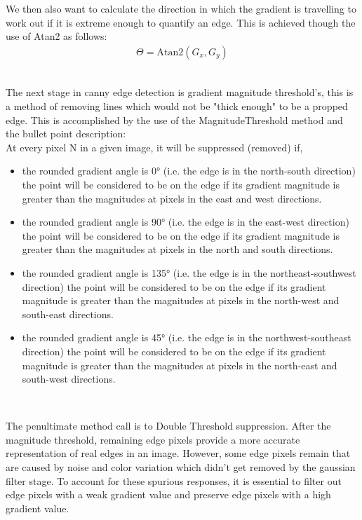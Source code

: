 \begin{FlushLeft}
    We then also want to calculate the direction in which the gradient is travelling to work out if it is extreme enough to quantify an edge. This is achieved though the use of Atan2 as follows:\\
    
    \begin{gather*}
        \Theta = \text{Atan2}(G_x, G_y)
    \end{gather*} \\ 

    \bk

    The next stage in canny edge detection is gradient magnitude threshold's, this is a method of removing lines which would not be "thick enough" to be a propped edge. This is accomplished by the use of the MagnitudeThreshold method and the bullet point description: \\ 
    
    At every pixel N in a given image, it will be suppressed (removed) if,
    \begin{itemize}
        \item the rounded gradient angle is 0° (i.e. the edge is in the north-south direction) the point will be considered to be on the edge if its gradient magnitude is greater than the magnitudes at pixels in the east and west directions.
        \item the rounded gradient angle is 90° (i.e. the edge is in the east-west direction) the point will be considered to be on the edge if its gradient magnitude is greater than the magnitudes at pixels in the north and south directions.
        \item the rounded gradient angle is 135° (i.e. the edge is in the northeast-southwest direction) the point will be considered to be on the edge if its gradient magnitude is greater than the magnitudes at pixels in the north-west and south-east directions.
        \item the rounded gradient angle is 45° (i.e. the edge is in the northwest-southeast direction) the point will be considered to be on the edge if its gradient magnitude is greater than the magnitudes at pixels in the north-east and south-west directions.

    \end{itemize}
    
    \\ \bk

    The penultimate method call is to Double Threshold suppression. After the magnitude threshold, remaining edge pixels provide a more accurate representation of real edges in an image. However, some edge pixels remain that are caused by noise and color variation which didn't get removed by the gaussian filter stage. To account for these spurious responses, it is essential to filter out edge pixels with a weak gradient value and preserve edge pixels with a high gradient value. \\


\end{FlushLeft}
